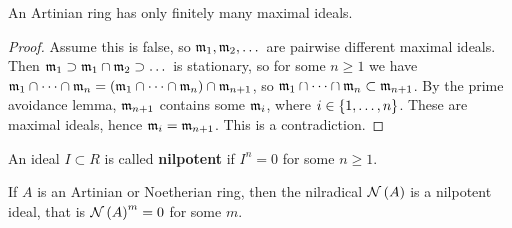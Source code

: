 \begin{lemma}
\label{lem:13.9}
An Artinian ring has only finitely many maximal ideals.
\end{lemma}

\begin{proof}
Assume this is false, so $ \mathfrak{m}_1, \mathfrak{m}_2, \dots $ are pairwise different maximal ideals. Then $ \mathfrak{m}_1 \supset \mathfrak{m}_1 \cap \mathfrak{m}_2 \supset \dots $ is stationary, so for some $ n \ge 1 $ we have $ \mmm_1 \cap \dots \cap \mmm_n = \br{\mmm_1 \cap \dots \cap \mmm_n} \cap \mmm_{n + 1} $, so $ \mathfrak{m}_1 \cap \dots \cap \mathfrak{m}_n \subset \mathfrak{m}_{n + 1} $. By the prime avoidance lemma, $ \mathfrak{m}_{n + 1} $ contains some $ \mathfrak{m}_i $, where $ i \in \cbr{1, \dots, n} $. These are maximal ideals, hence $ \mathfrak{m}_i = \mathfrak{m}_{n + 1} $. This is a contradiction.
\end{proof}

\begin{definition*}
An ideal $ I \subset R $ is called \textbf{nilpotent} if $ I^n = 0 $ for some $ n \ge 1 $.
\end{definition*}

\begin{lemma}
\label{lem:13.10}
If $ A $ is an Artinian or Noetherian ring, then the nilradical $ \NNN\br{A} $ is a nilpotent ideal, that is $ \NNN\br{A}^m = 0 $ for some $ m $.
\end{lemma}


